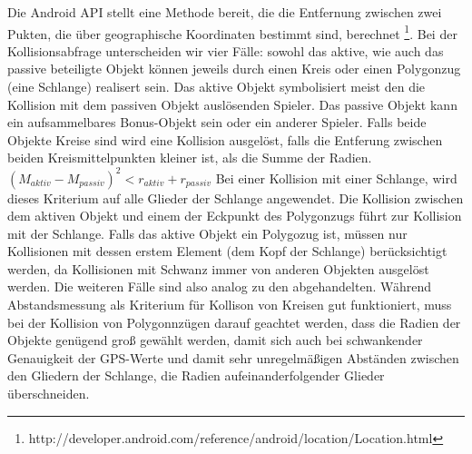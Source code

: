Die Android API stellt eine Methode bereit, die die Entfernung zwischen zwei Pukten, die über geographische Koordinaten bestimmt sind, berechnet \footnote{http://developer.android.com/reference/android/location/Location.html}.
Bei der Kollisionsabfrage unterscheiden wir vier Fälle: sowohl das aktive, wie auch das passive beteiligte Objekt können jeweils durch einen Kreis oder einen Polygonzug (eine Schlange) realisert sein.
Das aktive Objekt symbolisiert meist den die Kollision mit dem passiven Objekt auslösenden Spieler.
Das passive Objekt kann ein aufsammelbares Bonus-Objekt sein oder ein anderer Spieler.
Falls beide Objekte Kreise sind wird eine Kollision ausgelöst, falls die Entferung zwischen beiden Kreismittelpunkten kleiner ist, als die Summe der Radien.
$(M_{aktiv}-M_{passiv})^2<r_{aktiv}+r_{passiv}$
Bei einer Kollision mit einer Schlange, wird dieses Kriterium auf alle Glieder der Schlange angewendet. Die Kollision zwischen dem aktiven Objekt und einem der Eckpunkt des Polygonzugs führt zur Kollision mit der Schlange. 
Falls das aktive Objekt ein Polygozug ist, müssen nur Kollisionen mit dessen erstem Element (dem Kopf der Schlange) berücksichtigt werden, da Kollisionen mit Schwanz immer von anderen Objekten ausgelöst werden. Die weiteren Fälle sind also analog zu den abgehandelten.
Während Abstandsmessung als Kriterium für Kollison von Kreisen gut funktioniert, muss bei der Kollision von Polygonnzügen darauf geachtet werden, dass die Radien der Objekte genügend groß gewählt werden, damit sich auch bei schwankender Genauigkeit der GPS-Werte und damit sehr unregelmäßigen Abständen zwischen den Gliedern der Schlange, die Radien aufeinanderfolgender Glieder überschneiden.
